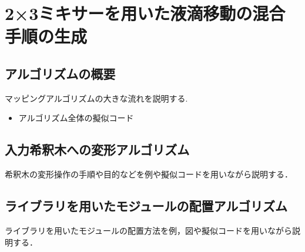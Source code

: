 \chapter{{2×3ミキサーを用いた液滴移動の混合手順の生成}}
\section{アルゴリズムの概要}
マッピングアルゴリズムの大きな流れを説明する.
\begin{itemize}
    \item {アルゴリズム全体の擬似コード}
\end{itemize}
\section{入力希釈木への変形アルゴリズム}
希釈木の変形操作の手順や目的などを例や擬似コードを用いながら説明する．
\section{ライブラリを用いたモジュールの配置{アルゴリズム}}
ライブラリを用いたモジュールの配置方法を例，図や擬似コードを用いながら説明する．
